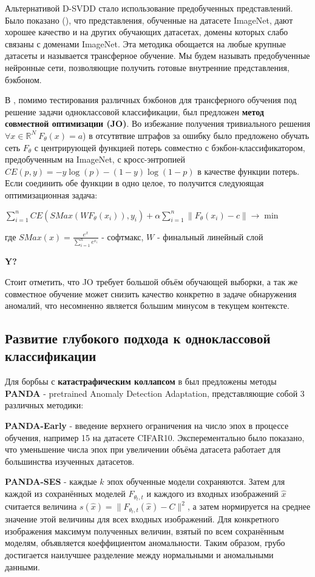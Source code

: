 \documentclass{article}
\begin{document}
\begin{large}
Альтернативой D-SVDD стало использование предобученных представлений. Было показано (\cite{transfer}), что представления, обученные на датасете ImageNet, дают хорошее качество и на других обучающих датасетах, домены которых слабо связаны с доменами ImageNet. Эта методика обощается на любые крупные датасеты и называется трансферное обучение. Мы будем называть предобученные нейронные сети, позволяющие получить готовые внутренние представления, бэкбоном.

В \cite{jo}, помимо тестирования различных бэкбонов для трансферного обучения под решение задачи одноклассовой классификации, был предложен \textbf{метод совместной оптимизации (JO)}. Во избежание получения тривиального решения  $\forall x \in \mathbb{R}^N \ F_{\theta}(x) = a$) в отсутвтвие штрафов за ошибку было предложено обучать сеть $F_{\theta}$ с центрирующей функцией потерь совместно с бэкбон-классификатором, предобученным на ImageNet, с кросс-энтропией $CE(p, y) = -y \log(p) - (1-y) \log(1-p)$ в качестве функции потерь. Если соединить обе функции в одно целое, то получится следуюящая оптимизационная задача:
\begin{center}
	$\sum\limits_{i=1}^{n} CE(SMax(W F_\theta(x_i)), y_i) + \alpha \sum\limits_{i=1}^{n} \|F_\theta(x_i) - c \| \rightarrow \min$
\end{center}
где $SMax(x) = \frac{e^x}{\sum_{i=1}^{n} e^{x_i}}$ - софтмакс, $W$ - финальный линейный слой

\textbf{Y?}

Стоит отметить, что JO требует большой объём обучающей выборки, а так же совместное обучение может снизить качество конкретно в задаче обнаружения аномалий, что несомненно является большим минусом в текущем контексте.

\subsection{Развитие глубокого подхода к одноклассовой классификации}

Для борбьы с \textbf{катастрафическим коллапсом} в \cite{panda} был предложены методы \textbf{PANDA} - pretrained Anomaly Detection Adaptation, представляющие собой 3 различных методики:

\textbf{PANDA-Early} - введение верхнего ограничения на число эпох в процессе обучения, например 15 на датасете CIFAR10. Эксперементально было показано, что уменьшение числа эпох при увеличении объёма датасета работает для большинства изученных датасетов.

\textbf{PANDA-SES} - каждые $k$ эпох обученные модели сохраняются. Затем для каждой из сохранённых моделей $F_{\theta_t, t}$ и каждого из входных изображений $\hat x$ считается величина $s(\hat x) = \| F_{\theta_t, t}(\hat x) - C \|^2$, а затем нормируется на среднее значение этой величины для всех входных изображений. Для конкретного изображения максимум полученных величин, взятый по всем сохранённым моделям, объявляется коеффициентом аномальности. Таким образом, грубо достигается наилучшее разделение между нормальными и аномальными данными. 


\end{large}
\end{document}
